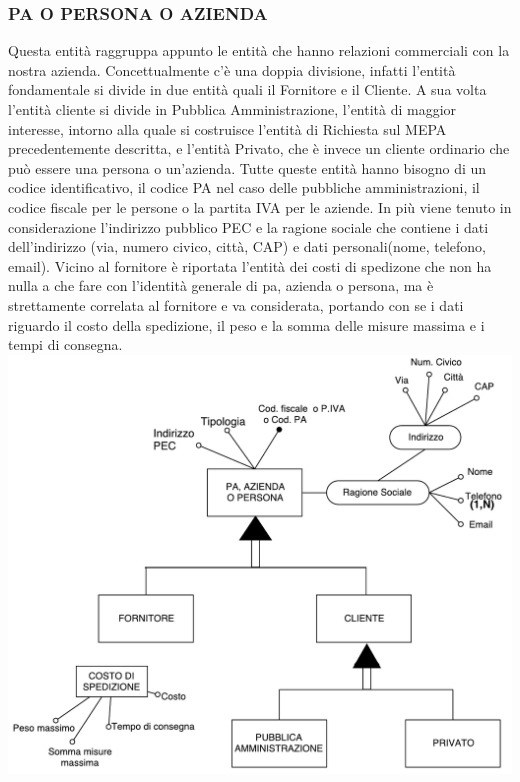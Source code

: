 \subsubsection{PA O PERSONA O AZIENDA}
Questa entità raggruppa appunto le entità che hanno relazioni commerciali con la nostra azienda. Concettualmente c'è una doppia divisione, infatti l'entità fondamentale si divide in due entità quali il Fornitore e il Cliente. A sua volta l'entità cliente si divide in Pubblica Amministrazione, l'entità di maggior interesse, intorno alla quale si costruisce l'entità di Richiesta sul MEPA precedentemente descritta, e l'entità Privato, che è invece un cliente ordinario che può essere una persona o un'azienda.\newline
Tutte queste entità hanno bisogno di un codice identificativo, il codice PA nel caso delle pubbliche amministrazioni, il codice fiscale per le persone o la partita IVA per le aziende. In più viene tenuto in considerazione l'indirizzo pubblico PEC e la ragione sociale che contiene i dati dell'indirizzo (via, numero civico, città, CAP) e dati personali(nome, telefono, email).\newline
Vicino al fornitore è riportata l'entità dei costi di spedizone che non ha nulla a che fare con l'identità generale di pa, azienda o persona, ma è strettamente correlata al fornitore e va considerata, portando con se i dati riguardo il costo della spedizione, il peso e la somma delle misure massima e i tempi di consegna.
\newline
\includegraphics[width=0.7\linewidth]{./immagini/pa_persona_o_azienda.pdf}

